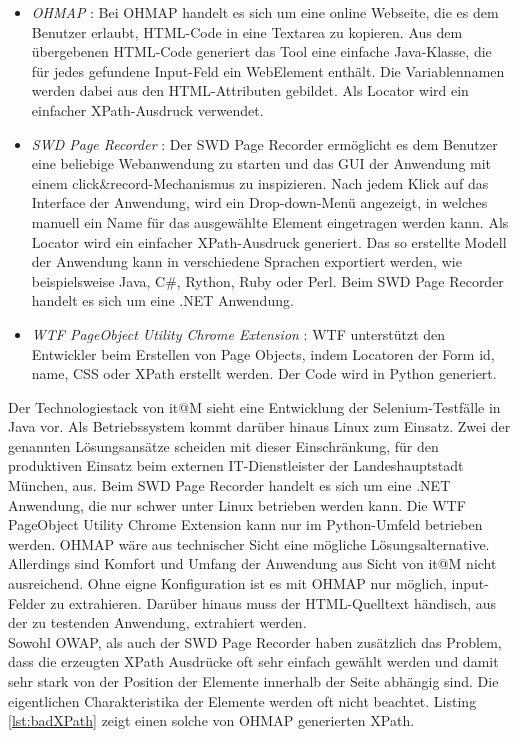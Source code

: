 \begin{itemize}
\item \textit{OHMAP} \cite{virtuetech_gmbh_ohmap_2015}: Bei OHMAP handelt es sich um eine online Webseite, die es dem Benutzer erlaubt, HTML-Code in eine Textarea zu kopieren. Aus dem übergebenen HTML-Code generiert das Tool eine einfache Java-Klasse, die für jedes gefundene Input-Feld ein WebElement enthält. Die Variablennamen werden dabei aus den HTML-Attributen gebildet. Als Locator wird ein einfacher XPath-Ausdruck verwendet.
	
\item \textit{SWD Page Recorder} \cite{dmytro_zharii_dzharii/swd-recorder_2015}: Der SWD Page Recorder ermöglicht es dem Benutzer eine beliebige Webanwendung zu starten und das GUI der Anwendung mit einem \grq click\&record\grq-Mechanismus zu inspizieren.
Nach jedem Klick auf das Interface der Anwendung, wird ein Drop-down-Menü angezeigt, in welches manuell ein Name für das ausgewählte Element eingetragen werden kann. Als Locator wird ein einfacher XPath-Ausdruck generiert.
Das so erstellte Modell der Anwendung kann in verschiedene Sprachen exportiert werden, wie beispielsweise Java, C\#, Rython, Ruby oder Perl. Beim SWD Page Recorder handelt es sich um eine .NET Anwendung.

\item\textit{ WTF PageObject Utility Chrome Extension} \cite{daniel_wiredrive/wtframework_2015}: WTF unterstützt den Entwickler beim Erstellen von Page Objects, indem Locatoren der Form id, name, CSS oder XPath erstellt werden. Der Code wird in Python generiert.
	
\end{itemize}

Der Technologiestack von it@M sieht eine Entwicklung der Selenium-Testfälle in Java vor. Als Betriebssystem kommt darüber hinaus Linux zum Einsatz.
Zwei der genannten Lösungsansätze scheiden mit dieser Einschränkung, für den produktiven Einsatz beim externen IT-Dienstleister der Landeshauptstadt München, aus. Beim SWD Page Recorder handelt es sich um eine .NET Anwendung, die nur schwer unter Linux betrieben werden kann. Die WTF PageObject Utility Chrome Extension kann nur im Python-Umfeld betrieben werden. OHMAP wäre aus technischer Sicht eine mögliche Lösungsalternative. Allerdings sind Komfort und Umfang der Anwendung aus Sicht von it@M nicht ausreichend. Ohne eigne Konfiguration ist es mit OHMAP nur möglich, input-Felder zu extrahieren.
Darüber hinaus muss der HTML-Quelltext händisch, aus der zu testenden Anwendung, extrahiert werden. \\
Sowohl OWAP, als auch der SWD Page Recorder haben zusätzlich das Problem, dass die erzeugten XPath Ausdrücke oft sehr einfach gewählt werden und damit sehr stark von der Position der Elemente innerhalb der Seite abhängig sind. Die eigentlichen Charakteristika der Elemente werden oft nicht beachtet. Listing \ref{lst:badXPath}
zeigt einen solche von OHMAP generierten XPath.

